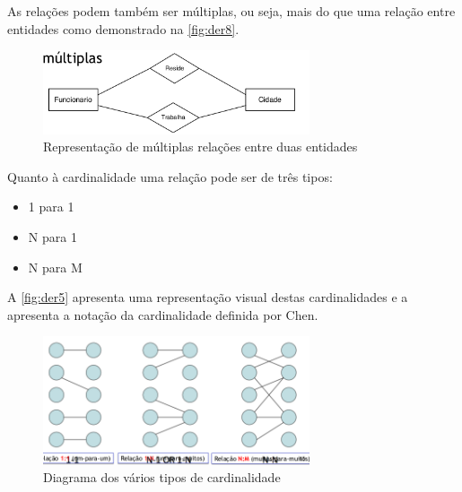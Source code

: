 \documentclass[11pt,twoside,a4paper]{report}
\begin{document}
As relações podem também ser múltiplas, ou seja, mais do que uma relação entre entidades como demonstrado na \autoref{fig:der8}.
\begin{figure}[H]
	\begin{center}
		\includegraphics[width=0.7\textwidth]{notacao3} %
		\caption{Representação de múltiplas relações entre duas entidades}
		\label{fig:der8}
	\end{center}
\end{figure}
Quanto à cardinalidade uma relação pode ser de três tipos:
\begin{itemize}[noitemsep]
	\item 1 para 1
	\item N para 1
	\item N para M
\end{itemize}
A \autoref{fig:der5} apresenta uma representação visual destas cardinalidades e a  apresenta a notação da cardinalidade definida por Chen.
\begin{figure}[H]
	\begin{center}
		\includegraphics[width=0.7\textwidth]{notacao4} %
		\caption{Diagrama dos vários tipos de cardinalidade}
		\label{fig:der5}
	\end{center}
\end{figure}
\end{document}
